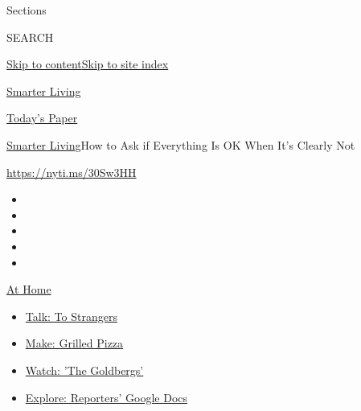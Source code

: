 Sections

SEARCH

\protect\hyperlink{site-content}{Skip to
content}\protect\hyperlink{site-index}{Skip to site index}

\href{https://www.nytimes3xbfgragh.onion/section/smarter-living}{Smarter
Living}

\href{https://myaccount.nytimes3xbfgragh.onion/auth/login?response_type=cookie\&client_id=vi}{}

\href{https://www.nytimes3xbfgragh.onion/section/todayspaper}{Today's
Paper}

\href{/section/smarter-living}{Smarter Living}\textbar{}How to Ask if
Everything Is OK When It's Clearly Not

\url{https://nyti.ms/30Sw3HH}

\begin{itemize}
\item
\item
\item
\item
\item
\end{itemize}

\href{https://www.nytimes3xbfgragh.onion/spotlight/at-home?action=click\&pgtype=Article\&state=default\&region=TOP_BANNER\&context=at_home_menu}{At
Home}

\begin{itemize}
\tightlist
\item
  \href{https://www.nytimes3xbfgragh.onion/2020/08/03/well/family/the-benefits-of-talking-to-strangers.html?action=click\&pgtype=Article\&state=default\&region=TOP_BANNER\&context=at_home_menu}{Talk:
  To Strangers}
\item
  \href{https://www.nytimes3xbfgragh.onion/2020/08/01/at-home/coronavirus-make-pizza-on-a-grill.html?action=click\&pgtype=Article\&state=default\&region=TOP_BANNER\&context=at_home_menu}{Make:
  Grilled Pizza}
\item
  \href{https://www.nytimes3xbfgragh.onion/2020/07/31/arts/television/goldbergs-abc-stream.html?action=click\&pgtype=Article\&state=default\&region=TOP_BANNER\&context=at_home_menu}{Watch:
  'The Goldbergs'}
\item
  \href{https://www.nytimes3xbfgragh.onion/interactive/2020/at-home/even-more-reporters-editors-diaries-lists-recommendations.html?action=click\&pgtype=Article\&state=default\&region=TOP_BANNER\&context=at_home_menu}{Explore:
  Reporters' Google Docs}
\end{itemize}

